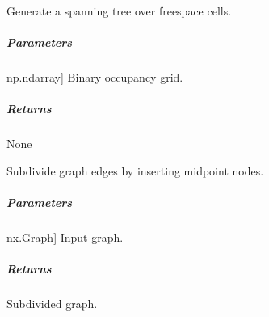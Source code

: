 \documentclass[letterpaper,10pt,english]{sphinxmanual}
\begin{document}
\begin{fulllineitems}
\begin{fulllineitems}
\begin{description}
\end{description}

\end{fulllineitems}


\begin{fulllineitems}
\label{\detokenize{mirte_lc_nav2.navigators:mirte_lc_nav2.navigators.SpanningTreePath.spanning_tree}}
\pysigstartsignatures
\pysiglinewithargsret
{}
{}
{}
\pysigstopsignatures
\sphinxAtStartPar
Generate a spanning tree over free\sphinxhyphen{}space cells.


\subparagraph{Parameters}
\label{\detokenize{mirte_lc_nav2.navigators:id24}}\begin{description}
\sphinxlineitem{grid}{[}np.ndarray{]}
\sphinxAtStartPar
Binary occupancy grid.

\end{description}


\subparagraph{Returns}
\label{\detokenize{mirte_lc_nav2.navigators:id25}}
\sphinxAtStartPar
None

\end{fulllineitems}


\begin{fulllineitems}
\label{\detokenize{mirte_lc_nav2.navigators:mirte_lc_nav2.navigators.SpanningTreePath.subdivide}}
\pysigstartsignatures
\pysiglinewithargsret
{}
{}
{}
\pysigstopsignatures
\sphinxAtStartPar
Subdivide graph edges by inserting midpoint nodes.


\subparagraph{Parameters}
\label{\detokenize{mirte_lc_nav2.navigators:id26}}\begin{description}
\sphinxlineitem{G}{[}nx.Graph{]}
\sphinxAtStartPar
Input graph.

\end{description}


\subparagraph{Returns}
\label{\detokenize{mirte_lc_nav2.navigators:id27}}\begin{description}
\sphinxAtStartPar
Subdivided graph.

\end{description}

\end{fulllineitems}


\end{fulllineitems}
\end{document}
